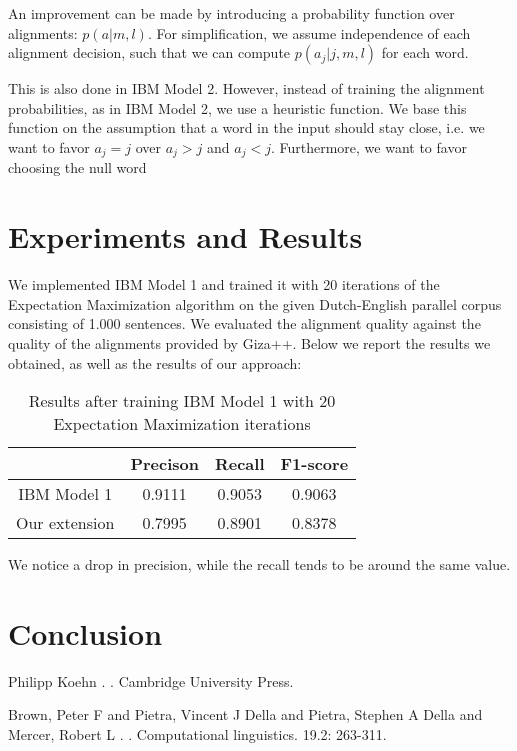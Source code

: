 \documentclass[11pt]{article}
\begin{document}
An improvement can be made by introducing a probability function over alignments: $p(a|m,l)$. 
For simplification, we assume independence of each alignment decision, such that we can compute $p(a_j|j,m,l)$ for each word.

This is also done in IBM Model 2. However,  instead of training the alignment probabilities, as in IBM Model 2, we use a heuristic function. We base this function on the assumption that a word in the input should stay close, i.e. we want to favor $a_j=j$ over $a_j>j$ and $a_j<j$. Furthermore, we want to favor choosing the null word %

\section{Experiments and Results}
\label{Eval}
We implemented IBM Model 1 and trained it with 20 iterations of the Expectation Maximization algorithm on the given Dutch-English parallel corpus consisting of 1.000 sentences. We evaluated the alignment quality against the quality of the alignments provided by Giza++. Below we report the results we obtained, as well as the results of our approach:

\begin{table}[h]
\centering
\begin{tabular}{|c | c | c | c |}
  \hline
  & \textbf{Precison} & \textbf{Recall} & \textbf{F1-score} \\
  \hline 
  IBM Model 1 & 0.9111 & 0.9053 & 0.9063\\
  Our extension & 0.7995 & 0.8901 & 0.8378\\
  \hline
\end{tabular}
\caption{Results after training IBM Model 1 with 20 Expectation Maximization iterations}
\label{results}
\end{table}

We notice a drop in precision, while the recall tends to be around the same value.

\section{Conclusion}
\label{Concl}

\begin{thebibliography}{}

Philipp Koehn
.
.
\newblock Cambridge University Press.

Brown, Peter F and Pietra, Vincent J Della and Pietra, Stephen A Della and Mercer, Robert L
.
.
\newblock Computational linguistics. 19.2: 263-311.

\end{thebibliography}
\end{document}

